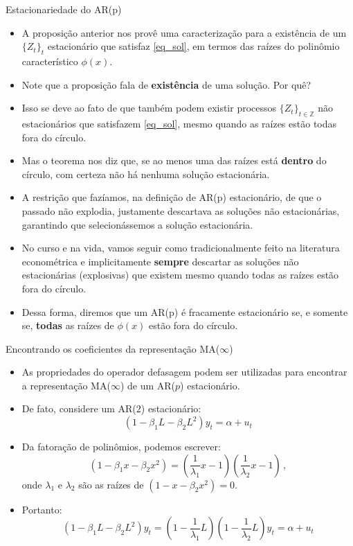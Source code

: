 \documentclass[11pt]{beamer}
\newenvironment{halfwideitemize}{\itemize\addtolength{\itemsep}{0.5em}}{\enditemize}
\begin{document}
	\begin{frame}{Estacionariedade do AR(p)}
\begin{itemize}
	\item A proposição anterior nos provê uma caracterização para a existência de um $\{Z_t\}_t$ estacionário que satisfaz \eqref{eq_sol}, em termos das {\color{blue}raízes do polinômio característico} $\phi(x)$.
	\begin{halfwideitemize}
		\item Note que a proposição fala de \textbf{existência} de {\color{red}uma} solução. Por quê?
		\item Isso se deve ao fato de que também podem existir processos $\{Z_t\}_{t \in \mathbb{Z}}$ não estacionários que satisfazem \eqref{eq_sol}, mesmo quando as raízes estão todas fora do círculo.
		\begin{halfwideitemize}
			\item Mas o teorema nos diz que, se ao menos uma das raízes está \textbf{dentro} do círculo, com certeza não há nenhuma solução estacionária.
		\end{halfwideitemize}
		\item A restrição que fazíamos, na definição de AR(p) estacionário, de que o passado não explodia, justamente descartava as soluções não estacionárias, garantindo que selecionássemos a solução estacionária.
	\end{halfwideitemize}
			\item No curso e na vida, vamos seguir como tradicionalmente feito na literatura econométrica e implicitamente \textbf{sempre} descartar as soluções não estacionárias (explosivas) que existem mesmo quando todas as raízes estão fora do círculo.
			\begin{halfwideitemize}
				\item {\color{green}Dessa forma, diremos que um AR(p) é fracamente estacionário se, e somente se, \textbf{todas} as raízes de $\phi(x)$ estão fora do círculo.}
			\end{halfwideitemize}
\end{itemize}
\end{frame}
\begin{frame}{Encontrando os coeficientes da representação MA($\infty$)}
	\begin{itemize}
		\item As propriedades do operador defasagem podem ser utilizadas para encontrar a representação MA($\infty$) de um AR($p$) estacionário.
		\item De fato, considere um AR($2$) estacionário:
		$$(1-\beta_1 L - \beta_2 L^2)y_t = \alpha + u_t$$
		\item Da fatoração de polinômios,  podemos escrever:
		$$(1-\beta_1 x - \beta_2 x^2) = \left(\frac{1}{\lambda_1}x-1\right)\left(\frac{1}{\lambda_2}x-1\right)\, ,$$
		onde $\lambda_1$ e $\lambda_2$ são as raízes de $(1- x - \beta_2 x^2) = 0$.
		\item Portanto:
		$$(1-\beta_1 L - \beta_2 L^2)y_t =   \left(1- \frac{1}{\lambda_1}L\right) \left(1-\frac{1}{\lambda_2}L\right)y_t = \alpha + u_t$$
	\end{itemize}
\end{frame}
\end{document}
